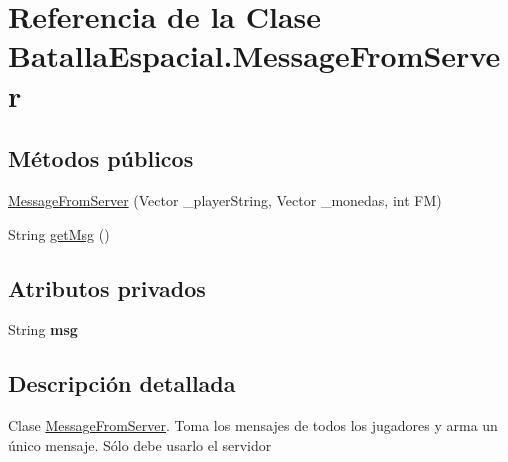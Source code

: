 \hypertarget{classBatallaEspacial_1_1MessageFromServer}{
\section{Referencia de la Clase BatallaEspacial.MessageFromServer}
\label{classBatallaEspacial_1_1MessageFromServer}
}
\subsection*{Métodos públicos}
\begin{DoxyCompactItemize}
\item 
\hyperlink{classBatallaEspacial_1_1MessageFromServer_a7696ba75d83b0ea75b9e5ab20e80f491}{MessageFromServer} (Vector \_\-playerString, Vector \_\-monedas, int FM)
\item 
String \hyperlink{classBatallaEspacial_1_1MessageFromServer_ac86e77f8b599a205c423d89bbb2ebf1e}{getMsg} ()
\end{DoxyCompactItemize}
\subsection*{Atributos privados}
\begin{DoxyCompactItemize}
\item 
\hypertarget{classBatallaEspacial_1_1MessageFromServer_ae7d73f33c96c193cf8d0ce45f83e98c8}{
String {\bfseries msg}}
\label{classBatallaEspacial_1_1MessageFromServer_ae7d73f33c96c193cf8d0ce45f83e98c8}

\end{DoxyCompactItemize}


\subsection{Descripción detallada}
Clase \hyperlink{classBatallaEspacial_1_1MessageFromServer}{MessageFromServer}. Toma los mensajes de todos los jugadores y arma un único mensaje. Sólo debe usarlo el servidor 


